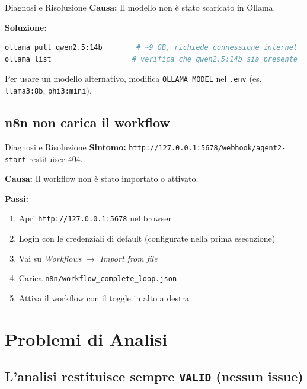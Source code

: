 \documentclass[12pt,a4paper]{report}
\begin{document}
\begin{technicalbox}{Diagnosi e Risoluzione}
\textbf{Causa:} Il modello non è stato scaricato in Ollama.

\textbf{Soluzione:}
\begin{lstlisting}[language=bash]
ollama pull qwen2.5:14b        # ~9 GB, richiede connessione internet
ollama list                   # verifica che qwen2.5:14b sia presente
\end{lstlisting}
Per usare un modello alternativo, modifica \texttt{OLLAMA\_MODEL} nel
\texttt{.env} (es. \texttt{llama3:8b}, \texttt{phi3:mini}).
\end{technicalbox}

\subsection{n8n non carica il workflow}

\begin{technicalbox}{Diagnosi e Risoluzione}
\textbf{Sintomo:} \texttt{http://127.0.0.1:5678/webhook/agent2-start} restituisce 404.

\textbf{Causa:} Il workflow non è stato importato o attivato.

\textbf{Passi:}
\begin{enumerate}
  \item Apri \texttt{http://127.0.0.1:5678} nel browser
  \item Login con le credenziali di default (configurate nella prima esecuzione)
  \item Vai su \textit{Workflows} $\rightarrow$ \textit{Import from file}
  \item Carica \texttt{n8n/workflow\_complete\_loop.json}
  \item Attiva il workflow con il toggle in alto a destra
\end{enumerate}
\end{technicalbox}

\section{Problemi di Analisi}

\subsection{L'analisi restituisce sempre \texttt{VALID} (nessun issue)}
\end{document}
